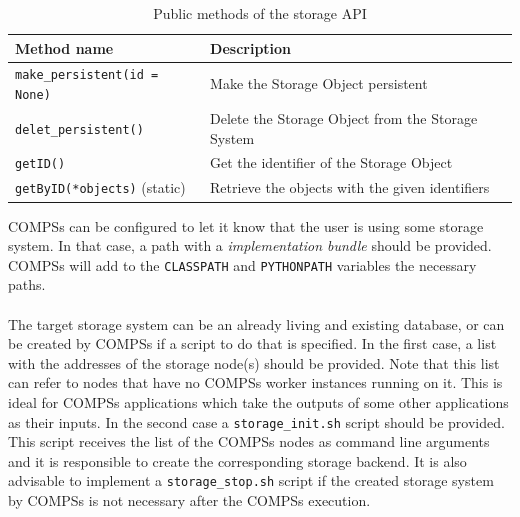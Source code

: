\begin{table}[]
\centering
\begin{tabular}{|l|l|}
\hline
Method name                                                     & Description                                                        \\ \hline
\verb|make_persistent(id = None)| & Make the Storage Object persistent                                 \\ \hline
\verb|delet_persistent()|        & Delete the Storage Object from the Storage System                  \\ \hline
\verb|getID()|                     & Get the identifier of the Storage Object                           \\ \hline
\verb|getByID(*objects)| (static)  & Retrieve the objects with the given identifiers \\ \hline
\end{tabular}
\caption{Public methods of the storage API}
\label{table:storage_api_public_methods}
\end{table}

COMPSs can be configured to let it know that the user is using some storage system. In that case, a path with a \textit{implementation bundle} should be provided. COMPSs will add to the \verb|CLASSPATH| and \verb|PYTHONPATH| variables the necessary paths.\\
\\
The target storage system can be an already living and existing database, or can be created by COMPSs if a script to do that is specified. In the first case, a list with the addresses of the storage node(s) should be provided. Note that this list can refer to nodes that have no COMPSs worker instances running on it. This is ideal for COMPSs applications which take the outputs of some other applications as their inputs. In the second case a \verb|storage_init.sh| script should be provided. This script receives the list of the COMPSs nodes as command line arguments and it is responsible to create the corresponding storage backend. It is also advisable to implement a \verb|storage_stop.sh| script if the created storage system by COMPSs is not necessary after the COMPSs execution.

